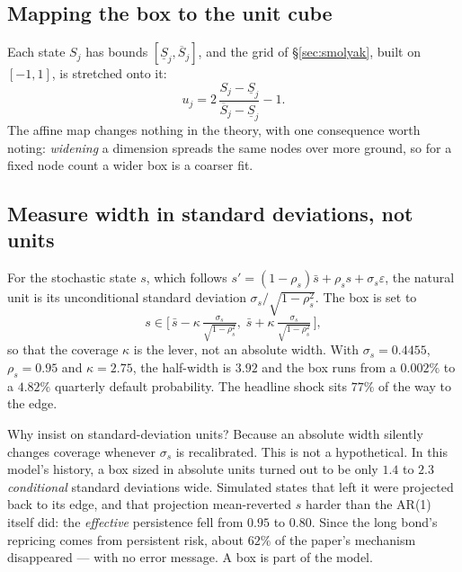 \documentclass[10pt,a4paper]{article}
\theoremstyle{plain}
\theoremstyle{remark}
\begin{document}
\subsection{Mapping the box to the unit cube}

Each state $S_j$ has bounds $[\underline S_j,\overline S_j]$, and the grid of
\S\ref{sec:smolyak}, built on $[-1,1]$, is stretched onto it:
\begin{equation}
  u_j = 2\,\frac{S_j-\underline S_j}{\overline S_j-\underline S_j} - 1 .
\end{equation}
The affine map changes nothing in the theory, with one consequence worth noting:
\emph{widening} a dimension spreads the same nodes over more ground, so for a fixed node count
a wider box is a coarser fit.

\subsection{Measure width in standard deviations, not units}

For the stochastic state $s$, which follows $s' = (1-\rho_s)\bar s + \rho_s s + \sigma_s\varepsilon$,
the natural unit is its unconditional standard deviation $\sigma_s/\sqrt{1-\rho_s^2}$. The
box is set to
\begin{equation}
  s \in \Big[\,\bar s - \kappa\,\tfrac{\sigma_s}{\sqrt{1-\rho_s^2}},\;
  \bar s + \kappa\,\tfrac{\sigma_s}{\sqrt{1-\rho_s^2}}\,\Big],
\end{equation}
so that the coverage $\kappa$ is the lever, not an absolute width. With $\sigma_s = 0.4455$,
$\rho_s = 0.95$ and $\kappa = 2.75$, the half-width is $3.92$ and the box runs from a $0.002\%$
to a $4.82\%$ quarterly default probability. The headline shock sits $77\%$ of the way to the
edge.

Why insist on standard-deviation units? Because an absolute width silently changes coverage
whenever $\sigma_s$ is recalibrated. This is not a hypothetical. In this model's history, a box
sized in absolute units turned out to be only $1.4$ to $2.3$ \emph{conditional} standard
deviations wide. Simulated states that left it were projected back to its edge, and that
projection mean-reverted $s$ harder than the AR(1) itself did: the \emph{effective}
persistence fell from $0.95$ to $0.80$. Since the long bond's repricing comes from persistent
risk, about $62\%$ of the paper's mechanism disappeared --- with no error message. A box is part
of the model.
\end{document}
